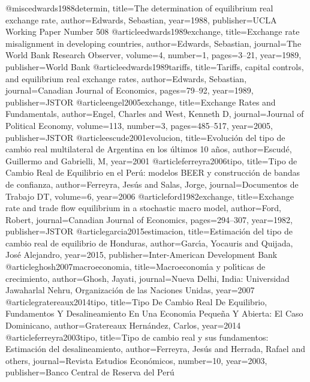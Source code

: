 @misc{edwards1988determin,
  title={The determination of equilibrium real exchange rate},
  author={Edwards, Sebastian},
  year={1988},
  publisher={UCLA Working Paper Number 508}
}
@article{edwards1989exchange,
  title={Exchange rate misalignment in developing countries},
  author={Edwards, Sebastian},
  journal={The World Bank Research Observer},
  volume={4},
  number={1},
  pages={3--21},
  year={1989},
  publisher={World Bank}
}
@article{edwards1989tariffs,
  title={Tariffs, capital controls, and equilibrium real exchange rates},
  author={Edwards, Sebastian},
  journal={Canadian Journal of Economics},
  pages={79--92},
  year={1989},
  publisher={JSTOR}
}
@article{engel2005exchange,
  title={Exchange Rates and Fundamentals},
  author={Engel, Charles and West, Kenneth D},
  journal={Journal of Political Economy},
  volume={113},
  number={3},
  pages={485--517},
  year={2005},
  publisher={JSTOR}
}
@article{escude2001evolucion,
  title={Evoluci{\'o}n del tipo de cambio real multilateral de Argentina en los {\'u}ltimos 10 a{\~n}os},
  author={Escud{\'e}, Guillermo and Gabrielli, M},
  year={2001}
}
@article{ferreyra2006tipo,
  title={Tipo de Cambio Real de Equilibrio en el Per{\'u}: modelos BEER y construcci{\'o}n de bandas de confianza},
  author={Ferreyra, Jes{\'u}s and Salas, Jorge},
  journal={Documentos de Trabajo DT},
  volume={6},
  year={2006}
}
@article{ford1982exchange,
  title={Exchange rate and trade flow equilibrium in a stochastic macro model},
  author={Ford, Robert},
  journal={Canadian Journal of Economics},
  pages={294--307},
  year={1982},
  publisher={JSTOR}
}
@article{garcia2015estimacion,
  title={Estimaci{\'o}n del tipo de cambio real de equilibrio de Honduras},
  author={Garc{\'\i}a, Yocauris and Quijada, Jos{\'e} Alejandro},
  year={2015},
  publisher={Inter-American Development Bank}
}
@article{ghosh2007macroeconomia,
  title={Macroeconom{\'\i}a y pol{\'\i}ticas de crecimiento},
  author={Ghosh, Jayati},
  journal={Nueva Delhi, India: Universidad Jawaharlal Nehru, Organizaci{\'o}n de las Naciones Unidas},
  year={2007}
}
@article{gratereaux2014tipo,
  title={Tipo De Cambio Real De Equilibrio, Fundamentos Y Desalineamiento En Una Econom{\'\i}a Peque{\~n}a Y Abierta: El Caso Dominicano},
  author={Gratereaux Hern{\'a}ndez, Carlos},
  year={2014}
}
@article{ferreyra2003tipo,
  title={Tipo de cambio real y sus fundamentos: Estimaci{\'o}n del desalineamiento},
  author={Ferreyra, Jes{\'u}s and Herrada, Rafael and others},
  journal={Revista Estudios Econ{\'o}micos},
  number={10},
  year={2003},
  publisher={Banco Central de Reserva del Per{\'u}}
}
